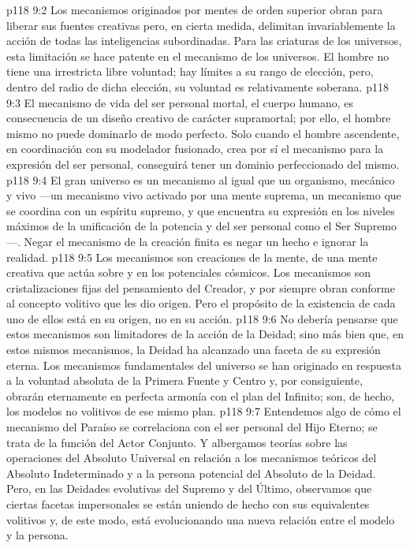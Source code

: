 \vs p118 9:2 Los mecanismos originados por mentes de orden superior obran para liberar sus fuentes creativas pero, en cierta medida, delimitan invariablemente la acción de todas las inteligencias subordinadas. Para las criaturas de los universos, esta limitación se hace patente en el mecanismo de los universos. El hombre no tiene una irrestricta libre voluntad; hay límites a su rango de elección, pero, dentro del radio de dicha elección, su voluntad es relativamente soberana.
\vs p118 9:3 El mecanismo de vida del ser personal mortal, el cuerpo humano, es consecuencia de un diseño creativo de carácter supramortal; por ello, el hombre mismo no puede dominarlo de modo perfecto. Solo cuando el hombre ascendente, en coordinación con su modelador fusionado, crea por sí el mecanismo para la expresión del ser personal, conseguirá tener un dominio perfeccionado del mismo.
\vs p118 9:4 El gran universo es un mecanismo al igual que un organismo, mecánico y vivo ---un mecanismo vivo activado por una mente suprema, un mecanismo que se coordina con un espíritu supremo, y que encuentra su expresión en los niveles máximos de la unificación de la potencia y del ser personal como el Ser Supremo---. Negar el mecanismo de la creación finita es negar un hecho e ignorar la realidad.
\vs p118 9:5 Los mecanismos son creaciones de la mente, de una mente creativa que actúa sobre y en los potenciales cósmicos. Los mecanismos son cristalizaciones fijas del pensamiento del Creador, y por siempre obran conforme al concepto volitivo que les dio origen. Pero el propósito de la existencia de cada uno de ellos está en su origen, no en su acción.
\vs p118 9:6 No debería pensarse que estos mecanismos son limitadores de la acción de la Deidad; sino más bien que, en estos mismos mecanismos, la Deidad ha alcanzado una faceta de su expresión eterna. Los mecanismos fundamentales del universo se han originado en respuesta a la voluntad absoluta de la Primera Fuente y Centro y, por consiguiente, obrarán eternamente en perfecta armonía con el plan del Infinito; son, de hecho, los modelos no volitivos de ese mismo plan.
\vs p118 9:7 Entendemos algo de cómo el mecanismo del Paraíso se correlaciona con el ser personal del Hijo Eterno; se trata de la función del Actor Conjunto. Y albergamos teorías sobre las operaciones del Absoluto Universal en relación a los mecanismos teóricos del Absoluto Indeterminado y a la persona potencial del Absoluto de la Deidad. Pero, en las Deidades evolutivas del Supremo y del Último, observamos que ciertas facetas impersonales se están uniendo de hecho con sus equivalentes volitivos y, de este modo, está evolucionando una nueva relación entre el modelo y la persona.
